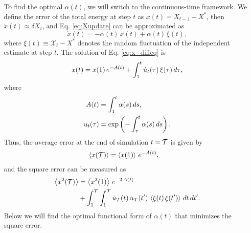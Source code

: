 \documentclass[reprint]{revtex4-1}
\begin{document}
To find the optimal $\alpha(t)$,
we will switch to the continuous-time framework.
%
We define the error of the total energy at step $t$ as
$x(t) = X_{t-1} - X^*$,
then $\dot x(t) \approx \delta X_t$,
and Eq. \eqref{eq:Xupdate} can be approximated as
%
\begin{equation}
  \dot x(t)
  =
  -\alpha(t) \, x(t) + \alpha(t) \, \xi(t)
  ,
  \label{eq:x_diffeq}
\end{equation}
%
where $\xi(t) \equiv \mathcal X_t - X^*$
denotes the random fluctuation of the independent estimate at step $t$.
%
The solution of Eq. \eqref{eq:x_diffeq} is
%
\begin{equation}
  x(t)
  =
  x(1) \, e^{ -A(t) }
  +
  \int_1^t \dot u_t(\tau) \, \xi(\tau) \, d\tau
  ,
  \notag
\end{equation}
%
where
\begin{align*}
  A(t)
  &=
  \int_1^t \alpha(s) \, ds
  ,
\\
  u_t(\tau)
  &= \exp\left(
    -\int_\tau^t \alpha(s) \, ds
  \right)
  .
  \notag
\end{align*}
%
Thus, the average error at the end of simulation $t = \mathcal T$
is given by
%
\begin{align}
  \left\langle
    x(\mathcal T)
  \right\rangle
  &=
  \left\langle
    x(1)
  \right\rangle
  \, e^{ -A(t) }
  ,
  \label{eq:abserr}
\end{align}
%
and the square error
can be measured as
%
\begin{align}
  \left\langle
    x^2(\mathcal T)
  \right\rangle
  &=
  \left\langle
    x^2(1)
  \right\rangle
  \, e^{ -2 \, A(t) }
  \notag \\
  &+
  \int_1^{\mathcal T}
  \int_1^{\mathcal T}
  \dot u_{\mathcal T}(t) \, \dot u_{\mathcal T}(t') \,
  \left\langle
    \xi(t) \, \xi(t')
  \right\rangle
  \, dt \, dt'
  .
  \label{eq:err_functional}
\end{align}
%
Below we will find the optimal functional form of $\alpha(t)$
that minimizes the square error.



\end{document}

